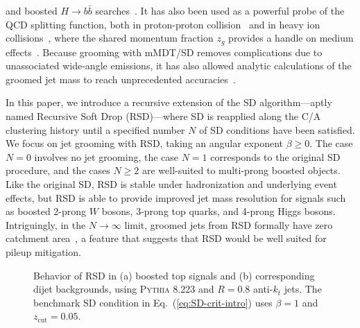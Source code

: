 \documentclass[11pt,a4paper]{article}
\newcommand{\zcut}{z_\text{cut}}
\newcommand{\pythia}[1]{\textsc{Pythia\xspace #1}}
\DeclareRobustCommand{\Eq}[1]{Eq.~(\ref{#1})}
\begin{document}
and boosted $H\rightarrow b\bar{b}$ searches~\cite{Sirunyan:2017dgc}.
%
It has also been used as a powerful probe of the QCD splitting
function, both in proton-proton
collision~\cite{Larkoski:2017bvj,Tripathee:2017ybi} and in heavy ion
collisions~\cite{Sirunyan:2017bsd,Caffarri:2017bmh,Kauder:2017mhg},
where the shared momentum fraction $z_g$ provides a handle on medium
effects~\cite{Chien:2016led,Milhano:2017nzm,Mehtar-Tani:2016aco}.
%
Because grooming with mMDT/SD removes complications due to
unassociated wide-angle emissions, it has also allowed analytic
calculations of the groomed jet mass to reach unprecedented
accuracies~\cite{Frye:2016okc,Frye:2016aiz,Marzani:2017mva,Marzani:2017kqd}.

In this paper, we introduce a recursive extension of the SD
algorithm---aptly named Recursive Soft Drop (RSD)---where SD is
reapplied along the C/A clustering history until a specified number
$N$ of SD conditions have been satisfied.
%
We focus on jet grooming with RSD, taking an angular
exponent $\beta \ge 0$.
%
The case $N=0$ involves no jet grooming, the case $N=1$ corresponds to
the original SD procedure, and the cases $N \ge 2$ are well-suited to
multi-prong boosted objects.
%
Like the original SD, RSD is stable under hadronization and underlying
event effects, but RSD is able to provide improved jet mass resolution
for signals such as boosted 2-prong $W$ bosons, 3-prong top quarks,
and 4-prong Higgs bosons.
%
Intriguingly, in the $N \to \infty$ limit, groomed jets from RSD formally have
zero catchment area~\cite{Cacciari:2008gn}, 
a feature that suggests that RSD would be well suited for pileup
mitigation.

\begin{figure}[t]
  \centering
  \qquad
  \caption{Behavior of RSD in (a) boosted top signals and (b)
    corresponding dijet backgrounds, using \pythia 8.223 and $R=0.8$
    anti-$k_t$ jets.  The benchmark SD condition in
    \Eq{eq:SD-crit-intro} uses $\beta = 1$ and $\zcut = 0.05$.}
  \label{fig:summary}
\end{figure}
\end{document}
